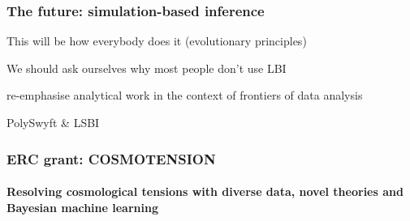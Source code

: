 \documentclass[aspectratio=169, handout]{beamer}
\begin{document}
\begin{frame}
    \frametitle{The future: simulation-based inference}

    This will be how everybody does it (evolutionary principles)

    We should ask ourselves why most people don't use LBI

    re-emphasise analytical work in the context of frontiers of data analysis

    PolySwyft \& LSBI
\end{frame}

\begin{frame}
    \frametitle{ERC grant: COSMOTENSION \hspace{95pt}\small {}}
    \framesubtitle{Resolving cosmological tensions with diverse data, novel theories and Bayesian machine learning}


\end{frame}
\end{document}
